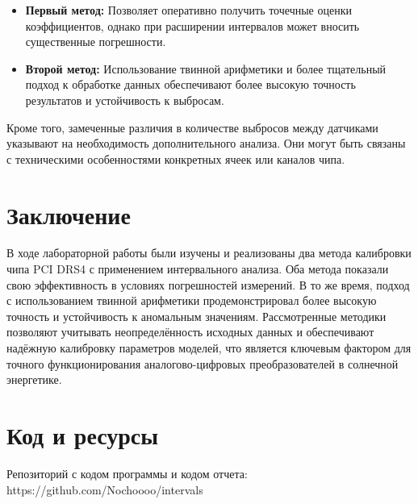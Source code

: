 \documentclass[a4paper,14pt]{extarticle}
\begin{document}
\begin{itemize}
\item \textbf{Первый метод:} Позволяет оперативно получить точечные оценки коэффициентов, однако при расширении интервалов может вносить существенные погрешности.
\item \textbf{Второй метод:} Использование твинной арифметики и более тщательный подход к обработке данных обеспечивают более высокую точность результатов и устойчивость к выбросам.
\end{itemize}

Кроме того, замеченные различия в количестве выбросов между датчиками указывают на необходимость дополнительного анализа. Они могут быть связаны с техническими особенностями конкретных ячеек или каналов чипа.

\section*{Заключение}

В ходе лабораторной работы были изучены и реализованы два метода калибровки чипа PCI DRS4 с применением интервального анализа. Оба метода показали свою эффективность в условиях погрешностей измерений. В то же время, подход с использованием твинной арифметики продемонстрировал более высокую точность и устойчивость к аномальным значениям. Рассмотренные методики позволяют учитывать неопределённость исходных данных и обеспечивают надёжную калибровку параметров моделей, что является ключевым фактором для точного функционирования аналогово-цифровых преобразователей в солнечной энергетике.

\section{Код и ресурсы}
Репозиторий с кодом программы и кодом отчета:\\
https://github.com/Nochoooo/intervals
\end{document}
